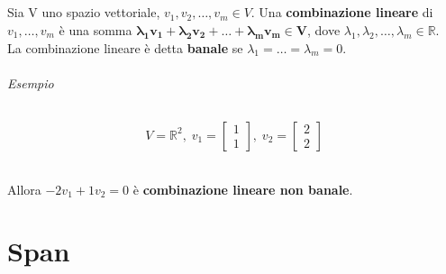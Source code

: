 \documentclass[a4paper, 12pt]{report}
\begin{document}
                \paragraph{}Sia V uno spazio vettoriale, $v_1,v_2,\dots,v_m \in V$.
                Una \textbf{combinazione lineare} di $v_1,\dots,v_m$ è una somma $\boldsymbol{\lambda_1 v_1+\lambda_2 v_2+\dots+\lambda_m v_m \in V}$, dove $\lambda_1,\lambda_2,\dots,\lambda_m \in \mathbb{R}$.\\
                La combinazione lineare è detta \textbf{banale} se $\lambda_1=\dots=\lambda_m=0$.
                \subparagraph{Esempio}
                    $$
                    V=\mathbb{R}^2,\;v_1=
                    \begin{bmatrix}
                        1\\
                        1
                    \end{bmatrix}
                    ,\;v_2=
                    \begin{bmatrix}
                        2\\
                        2
                    \end{bmatrix}
                    $$
                    \subparagraph{}Allora $-2v_1+1v_2=0$ è \textbf{combinazione lineare non banale}.
        \chapter{Span}
\end{document}
